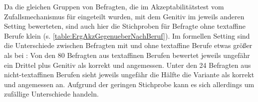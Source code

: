 Da die gleichen Gruppen von Befragten, die im Akzeptabilitätstest vom Zufallsmechanismus für \dank{} eingeteilt wurden, \gegenueber{} mit dem Genitiv im jeweils anderen Setting bewerteten, sind auch hier die Stichproben für Befragte ohne textaffine Berufe klein (s. \autoref{table:ErgAkzGegenueberNachBeruf}). 
Im formellen Setting sind die Unterschiede zwischen Befragten mit und ohne textaffine Berufe etwas größer als bei \dank:
Von den 80 Befragten aus textaffinen Berufen bewertet jeweils ungefähr ein Drittel \gegenueber{} plus Genitiv als korrekt und angemessen. 
Unter den 24 Befragten aus nicht-textaffinen Berufen sieht jeweils ungefähr die Hälfte die Variante als korrekt und angemessen an. 
Aufgrund der geringen Stichprobe kann es sich allerdings um zufällige Unterschiede handeln. 
